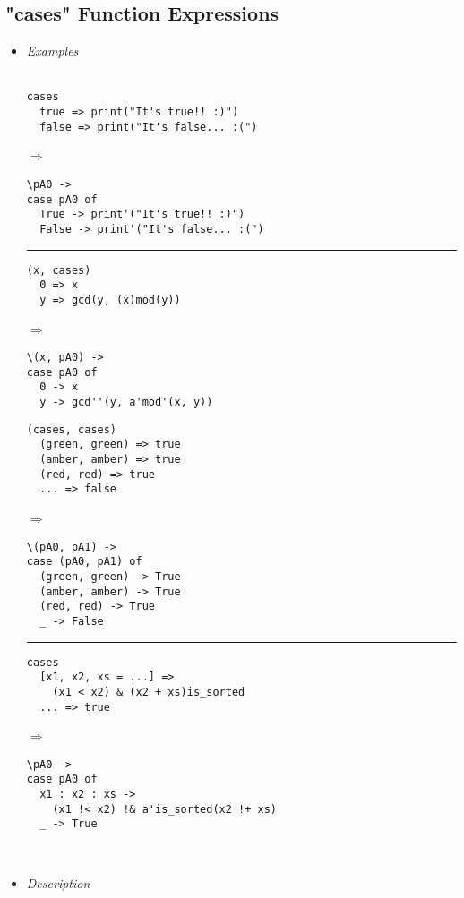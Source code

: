 \documentclass[diploma]{softlab-thesis}
\def\lra{$\Longrightarrow$\ }
\begin{document}
\newpage
\subsection{"cases" Function Expressions}
\begin{itemize}
\item
\textit{Examples}\\\\
\begin{minipage}[t][12cm][t]{\linewidth}
\begin{minipage}{0.47\linewidth}

\begin{verbatim}
cases
  true => print("It's true!! :)")
  false => print("It's false... :(")
\end{verbatim}
\lra
\begin{verbatim}
\pA0 ->
case pA0 of
  True -> print'("It's true!! :)")
  False -> print'("It's false... :(")
\end{verbatim}

\rule{\linewidth}{0.1pt}

\begin{verbatim}
(x, cases)
  0 => x
  y => gcd(y, (x)mod(y))
\end{verbatim}
\lra
\begin{verbatim}
\(x, pA0) ->
case pA0 of
  0 -> x
  y -> gcd''(y, a'mod'(x, y))
\end{verbatim}
\end{minipage}
\hfill\vline\hfill
\begin{minipage}{0.45\linewidth}
\begin{verbatim}
(cases, cases)
  (green, green) => true
  (amber, amber) => true
  (red, red) => true
  ... => false
\end{verbatim}
\lra
\begin{verbatim}
\(pA0, pA1) ->
case (pA0, pA1) of
  (green, green) -> True
  (amber, amber) -> True
  (red, red) -> True
  _ -> False
\end{verbatim}

\rule{\linewidth}{0.1pt}

\begin{verbatim}
cases
  [x1, x2, xs = ...] =>
    (x1 < x2) & (x2 + xs)is_sorted
  ... => true
\end{verbatim}
\lra
\begin{verbatim}
\pA0 ->
case pA0 of
  x1 : x2 : xs ->
    (x1 !< x2) !& a'is_sorted(x2 !+ xs)
  _ -> True
\end{verbatim}
\end{minipage}
\end{minipage}
\\
\item
\textit{Description}\\


\end{itemize}
\end{document}
